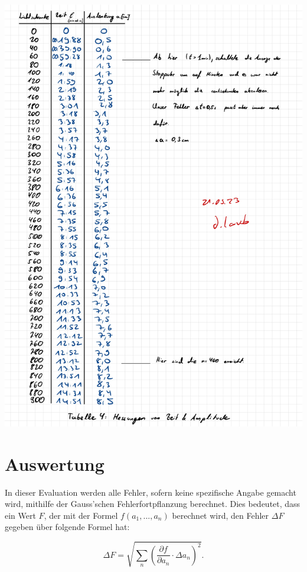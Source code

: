 \documentclass{article}
\begin{document}
\includegraphics[width=\textwidth]{graphics/mess3.jpg}
\newpage

\addtocounter{table}{4}

\section{Auswertung}

In dieser Evaluation werden alle Fehler, sofern keine spezifische Angabe gemacht wird, mithilfe der Gauss'schen Fehlerfortpflanzung berechnet. Dies bedeutet, dass ein Wert $F$, der mit der Formel $f(a_1, ..., a_n)$ berechnet wird, den Fehler $\Delta F$ gegeben über folgende Formel hat:

\begin{equation}
    \Delta F = \sqrt{\sum_n \left( \frac{\partial f}{\partial a_n} \cdot \Delta a_n \right)^2}.
\end{equation}
\end{document}
